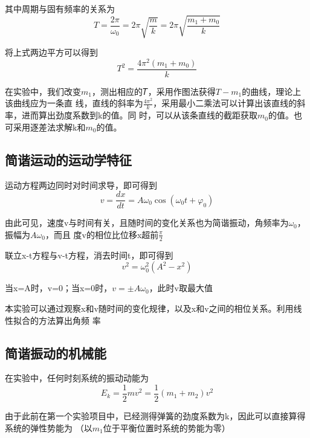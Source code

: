 \documentclass[11pt,a4paper]{article}
\begin{document}
其中周期与固有频率的关系为
\begin{equation}
    T = \frac{{2\pi }}{{{\omega _0}}} = 2\pi \sqrt {\frac{m}{k}}  = 2\pi \sqrt {\frac{{{m_1} + {m_0}}}{k}} 
\end{equation}

将上式两边平方可以得到
\begin{equation}
    {T^2} = \frac{{4{\pi ^2}\left( {{m_1} + {m_0}} \right)}}{k}
\end{equation}

在实验中，我们改变$m_1$，测出相应的𝑇，采用作图法获得$T-m_1$的曲线，理论上该曲线应为一条直
线，直线的斜率为$\frac{4 \pi^2}{k}$，采用最小二乘法可以计算出该直线的斜率，进而算出劲度系数到k的值。同
时，可以从该条直线的截距获取$m_0$的值。也可采用逐差法求解k和$m_0$的值。

\subsection{简谐运动的运动学特征}
运动方程两边同时对时间求导，即可得到
\begin{equation}
    v = \frac{{dx}}{{dt}} = A{\omega _0}\cos \left( {{\omega _0}t + {\varphi _0}} \right)
\end{equation}

由此可见，速度v与时间有关，且随时间的变化关系也为简谐振动，角频率为$\omega_0$，振幅为$A \omega_0$，而且
度v的相位比位移x超前$\frac{\pi}{2}$

联立x-t方程与v-t方程，消去时间t，即可得到
\begin{equation}
    {v^2} = \omega _0^2\left( {{A^2} - {x^2}} \right)
\end{equation}

当x=A时，v=0；当x=0时，$v =  \pm A{\omega _0}$，此时v取最大值

本实验可以通过观察x和v随时间的变化规律，以及x和v之间的相位关系。利用线性拟合的方法算出角频
率

\subsection{简谐振动的机械能}
在实验中，任何时刻系统的振动动能为
\begin{equation}
    {E_k} = \frac{1}{2}m{v^2} = \frac{1}{2}\left( {{m_1} + {m_2}} \right){v^2}
\end{equation}

由于此前在第一个实验项目中，已经测得弹簧的劲度系数为k，因此可以直接算得系统的弹性势能为
（以$m_1$位于平衡位置时系统的势能为零）
\end{document}
